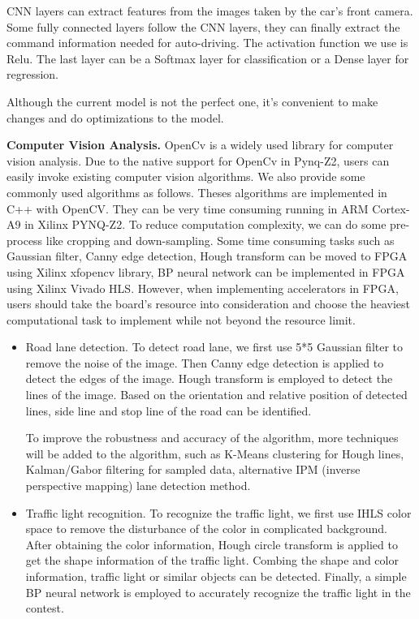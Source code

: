 \documentclass[conference]{IEEEtran}
\begin{document}
\begin{sloppypar}
CNN layers can extract features from the images taken by the car's front camera. Some fully connected layers follow the CNN layers, they can finally extract the command information needed for auto-driving. The activation function we use is Relu. The last layer can be a Softmax layer\cite{b25} for classification or a Dense layer for regression.  

Although the current model is not the perfect one, it's convenient to make changes and do optimizations to the model.

\textbf{Computer Vision Analysis.} OpenCv\cite{b20} is a widely used library for computer vision analysis. Due to the native support for OpenCv in Pynq-Z2, users can easily invoke existing computer vision algorithms. We also provide some commonly used algorithms as follows. Theses algorithms are implemented in C++ with OpenCV. They can be very time consuming running in ARM Cortex-A9 in Xilinx PYNQ-Z2. To reduce computation complexity, we can do some pre-process like cropping and down-sampling. Some time consuming tasks such as Gaussian filter, Canny edge detection, Hough transform can be moved to FPGA using Xilinx xfopencv library\cite{b30}, BP neural network can be implemented in FPGA using Xilinx Vivado HLS. However, when implementing accelerators in FPGA, users should take the board's resource into consideration and choose the heaviest computational task to implement while not beyond the resource limit.

\begin{itemize}
\item{Road lane detection.} To detect road lane, we first use 5*5 Gaussian filter to remove the noise of the image. Then Canny edge detection\cite{b26} is applied to detect the edges of the image. Hough transform\cite{b27} is employed to detect the lines of the image. Based on the orientation and relative position of detected lines, side line and stop line of the road can be identified. 

To improve the robustness and accuracy of the algorithm, more techniques will be added to the algorithm, such as K-Means clustering\cite{b28} for Hough lines, Kalman/Gabor filtering for sampled data, alternative IPM (inverse perspective mapping) lane detection method\cite{b29}.

\item{Traffic light recognition.} To recognize the traffic light, we first use IHLS color space\cite{b31} to remove the disturbance of the color in complicated background. After obtaining the color information, Hough circle transform\cite{b32} is applied to get the shape information of the traffic light. Combing the shape and color information, traffic light or similar objects can be detected. Finally, a simple BP neural network is employed to accurately recognize the traffic light in the contest.


\end{itemize}
\end{sloppypar}
\end{document}
